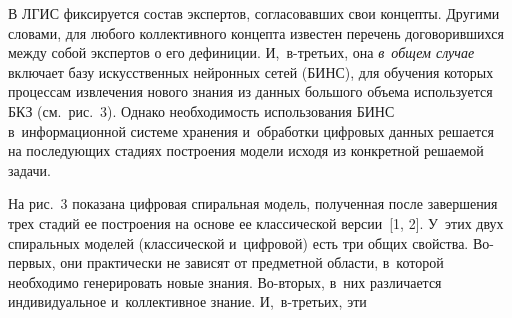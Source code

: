 \begin{multicols}{2}
  
  В ЛГИС фиксируется состав 
экспертов, согласовавших свои концепты. Другими словами, для любого 
коллективного концепта известен перечень договорившихся между собой 
экспертов о его дефиниции. И,~в-треть\-их, она \textit{в~общем случае} 
включает базу искусственных нейронных сетей (БИНС), для обуче\-ния 
которых процессам извлечения нового знания из данных большого объема 
используется БКЗ (см.\ рис.~3). Однако не\-об\-хо\-ди\-мость использования БИНС 
в~информационной  сис\-те\-ме хранения и~обработки циф\-ро\-вых данных 
решается на по\-сле\-ду\-ющих стадиях построения модели исходя из конкретной 
ре\-ша\-емой задачи.
  
  На рис.~3 показана цифровая спиральная модель, полученная после 
завершения трех стадий ее по\-стро\-ения на основе ее классической версии~[1, 2]. 
У~этих двух спиральных моделей (классической и~цифровой) есть три общих 
свойства. Во-пер\-вых, они практически не зависят от предметной области, 
в~которой необходимо генерировать новые знания. Во-вто\-рых, в~них 
различается индивидуальное и~коллективное знание. И,~в-треть\-их, эти\linebreak\vspace*{-12pt}

\pagebreak

\end{multicols}

  \begin{figure*} %
   \vspace*{1pt}
  \begin{center}
 \mbox{%
 \epsfxsize=128mm 
 }
\end{center}
\vspace*{-9pt}
  \vspace*{-6pt}
  \end{figure*}


